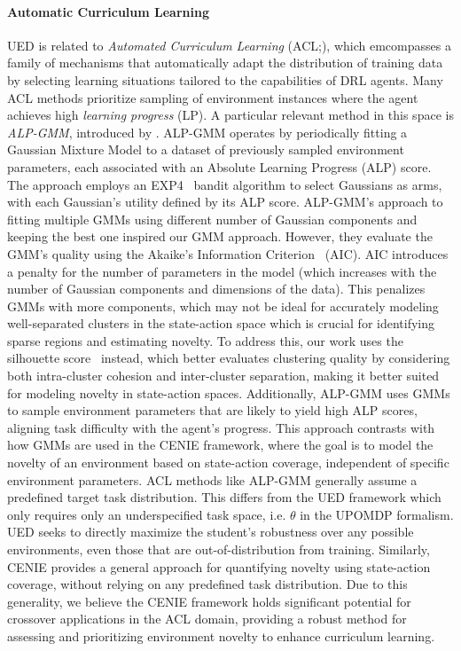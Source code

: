 \paragraph{Automatic Curriculum Learning} UED is related to {\em Automated Curriculum Learning} (ACL;\cite{portelas2021acl}), which emcompasses a family of mechanisms that automatically adapt the distribution of training data by selecting learning situations tailored to the capabilities of DRL agents. Many ACL methods prioritize sampling of environment instances where the agent achieves high {\em learning progress} (LP). A particular relevant method in this space is {\em ALP-GMM}, introduced by \citet{portelas2019alpgmm}. ALP-GMM operates by periodically fitting a Gaussian Mixture Model to a dataset of previously sampled environment parameters, each associated with an Absolute Learning Progress (ALP) score. The approach employs an EXP4~\cite{auer2002exp4} bandit algorithm to select Gaussians as arms, with each Gaussian’s utility defined by its ALP score. ALP-GMM's approach to fitting multiple GMMs using different number of Gaussian components and keeping the best one inspired our GMM approach. However, they evaluate the GMM's quality using the Akaike's Information Criterion~\cite{bozdoganModelselection1987} (AIC). AIC introduces a penalty for the number of parameters in the model (which increases with the number of Gaussian components and dimensions of the data). This penalizes GMMs with more components, which may not be ideal for accurately modeling well-separated clusters in the state-action space which is crucial for identifying sparse regions and estimating novelty. To address this, our work uses the silhouette score~\cite{rousseeuw1987silhouettes} instead, which better evaluates clustering quality by considering both intra-cluster cohesion and inter-cluster separation, making it better suited for modeling novelty in state-action spaces. Additionally, ALP-GMM uses GMMs to sample environment parameters that are likely to yield high ALP scores, aligning task difficulty with the agent’s progress. This approach contrasts with how GMMs are used in the CENIE framework, where the goal is to model the novelty of an environment based on state-action coverage, independent of specific environment parameters. ACL methods like ALP-GMM generally assume a predefined target task distribution. This differs from the UED framework which only requires only an underspecified task space, i.e. $\theta$ in the UPOMDP formalism. UED seeks to directly maximize the student’s robustness over any possible environments, even those that are out-of-distribution from training. Similarly, CENIE provides a general approach for quantifying novelty using state-action coverage, without relying on any predefined task distribution. Due to this generality, we believe the CENIE framework holds significant potential for crossover applications in the ACL domain, providing a robust method for assessing and prioritizing environment novelty to enhance curriculum learning.


